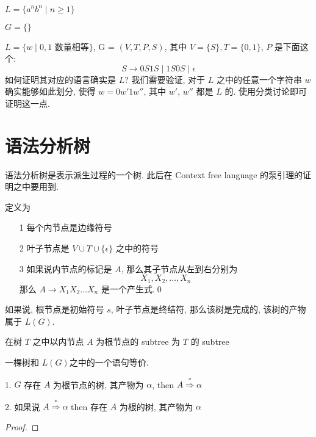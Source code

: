 \documentclass[../main_part1.tex]{subfiles}
\begin{document}
\begin{exam}
	\(L  = \{ a ^{n} b ^{n}\mid n \ge 1 \}\)
\end{exam}
\begin{exam}
	\(G = \{ \}\)
\end{exam}
\begin{exam}
	\(L = \{  w \mid 0,  1 \text{ 数量相等}\}\), G = \((V, T , P , S)\), 其中 \(V = \{ S \}, T = \{ 0 ,1 \}\), \(P \) 是下面这个:
	\[
	S \to 0S 1 S \mid 1 S 0 S  \mid \epsilon 
\]
如何证明其对应的语言确实是 \(L\)? 我们需要验证, 对于 \(L\) 之中的任意一个字符串 \(w\) 确实能够如此划分, 使得 \(w = 0 w' 1 w''\), 其中 \(w '\), \(w ''\) 都是 \(L\) 的. 使用分类讨论即可证明这一点. 
\end{exam}

\begin{exam}[算术表达式]
\end{exam}


\section{语法分析树}\label{sec:tree}
语法分析树是表示派生过程的一个树. 此后在 Context free language 的泵引理的证明之中要用到. 
\begin{definition}[分析树]\label{def:分析树}
定义为 
\begin{itemize}
\item [1] 
 每个内节点是边缘符号
\item [2] 
叶子节点是 \(V \cup T \cup \{ \epsilon \} \) 之中的符号 
\item [3] 
如果说内节点的标记是 \(A\), 那么其子节点从左到右分别为
\[
X_{1} , X _{2}, \dots , X _{n}
\]
那么 \(A \to X _{1} X _{2}\dots  X_{n}\) 是一个产生式.\qed 
\end{itemize}
\end{definition}

如果说, 根节点是初始符号 \(s\), 叶子节点是终结符, 那么该树是完成的, 该树的产物属于 \(L (G) \). 
\begin{definition}[subtree]\label{def:subtree}
在树 \(T\) 之中以内节点 \(A\) 为根节点的 subtree 为 \(T\) 的 subtree
\end{definition}

\begin{thm}
	一棵树和 \(L (G)\)之中的一个语句等价. 

	1. \(G\) 存在 \(A\) 为根节点的树, 其产物为 \(\alpha\), then \(A \overset{*}{\Rightarrow}\alpha\)

	2. 如果说 \(A \overset{*}{\Rightarrow}\alpha\) then 存在 \(A\) 为根的树, 其产物为 \(\alpha\)
\end{thm}
\begin{proof}
\end{proof}
\end{document}
